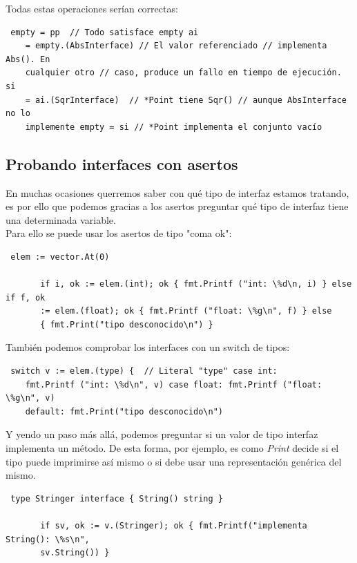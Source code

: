 	Todas estas operaciones serían correctas:
	
	\begin{verbatim} empty = pp  // Todo satisface empty ai
	= empty.(AbsInterface) // El valor referenciado // implementa Abs(). En
	cualquier otro // caso, produce un fallo en tiempo de ejecución.  si
	= ai.(SqrInterface)  // *Point tiene Sqr() // aunque AbsInterface no lo
	implemente empty = si // *Point implementa el conjunto vacío \end{verbatim}
	
	\subsection{Probando interfaces con asertos}
	
	En muchas ocasiones querremos saber con qué tipo de interfaz estamos
	tratando, es por ello que podemos gracias a los asertos preguntar qué tipo
	de interfaz tiene una determinada variable.\\
	
	Para ello se puede usar los asertos de tipo "coma ok":
	
	\begin{verbatim} elem := vector.At(0)
	   
	   if i, ok := elem.(int); ok { fmt.Printf ("int: \%d\n, i) } else if f, ok
	   := elem.(float); ok { fmt.Printf ("float: \%g\n", f) } else
	   { fmt.Print("tipo desconocido\n") } \end{verbatim} \clearpage También
	   podemos comprobar los interfaces con un switch de tipos:
	
	\begin{verbatim} switch v := elem.(type) {  // Literal "type" case int:
	fmt.Printf ("int: \%d\n", v) case float: fmt.Printf ("float: \%g\n", v)
	default: fmt.Print("tipo desconocido\n") \end{verbatim}
	
	Y yendo un paso más allá, podemos preguntar si un valor de tipo interfaz
	implementa un método. De esta forma, por ejemplo, es como \textit{Print}
	decide si el tipo puede imprimirse así mismo o si debe usar una
	representación genérica del mismo.
	
	\begin{verbatim} type Stringer interface { String() string }
	   
	   if sv, ok := v.(Stringer); ok { fmt.Printf("implementa String(): \%s\n",
	   sv.String()) } \end{verbatim}
	
